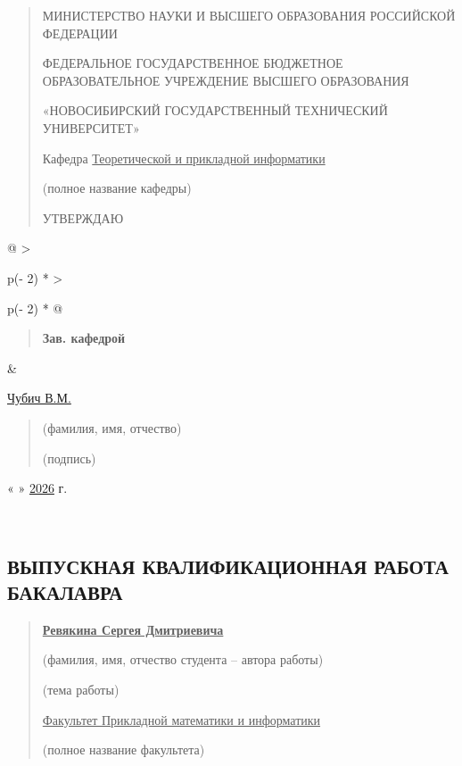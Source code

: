\begin{quote}
МИНИСТЕРСТВО НАУКИ И ВЫСШЕГО ОБРАЗОВАНИЯ РОССИЙСКОЙ ФЕДЕРАЦИИ

ФЕДЕРАЛЬНОЕ ГОСУДАРСТВЕННОЕ БЮДЖЕТНОЕ ОБРАЗОВАТЕЛЬНОЕ УЧРЕЖДЕНИЕ ВЫСШЕГО
ОБРАЗОВАНИЯ

«НОВОСИБИРСКИЙ ГОСУДАРСТВЕННЫЙ ТЕХНИЧЕСКИЙ УНИВЕРСИТЕТ»

Кафедра \ul{Теоретической и прикладной информатики}

(полное название кафедры)

УТВЕРЖДАЮ
\end{quote}

\begin{longtable}[]{@{}
  >{\raggedright\arraybackslash}p{(\columnwidth - 2\tabcolsep) * }
  >{\raggedright\arraybackslash}p{(\columnwidth - 2\tabcolsep) * }@{}}
\toprule\noalign{}
\begin{minipage}[b]{\linewidth}\raggedright
\begin{quote}
\textbf{Зав. кафедрой}
\end{quote}
\end{minipage} & \begin{minipage}[b]{\linewidth}\raggedright
\ul{Чубич В.М.}

\begin{quote}
(фамилия, имя, отчество)

(подпись)
\end{quote}

« » \ul{2026} г.
\end{minipage} \\
\midrule\noalign{}
\endhead
\bottomrule\noalign{}
\endlastfoot
\end{longtable}

\hypertarget{ux432ux44bux43fux443ux441ux43aux43dux430ux44f-ux43aux432ux430ux43bux438ux444ux438ux43aux430ux446ux438ux43eux43dux43dux430ux44f-ux440ux430ux431ux43eux442ux430-ux431ux430ux43aux430ux43bux430ux432ux440ux430}{%
\subsection*{ВЫПУСКНАЯ КВАЛИФИКАЦИОННАЯ РАБОТА
БАКАЛАВРА}\label{ux432ux44bux43fux443ux441ux43aux43dux430ux44f-ux43aux432ux430ux43bux438ux444ux438ux43aux430ux446ux438ux43eux43dux43dux430ux44f-ux440ux430ux431ux43eux442ux430-ux431ux430ux43aux430ux43bux430ux432ux440ux430}}

\begin{quote}
\textbf{\ul{Ревякина Сергея Дмитриевича}}

(фамилия, имя, отчество студента -- автора работы)

(тема работы)

\ul{Факультет Прикладной математики и информатики}

(полное название факультета)
\end{quote}

